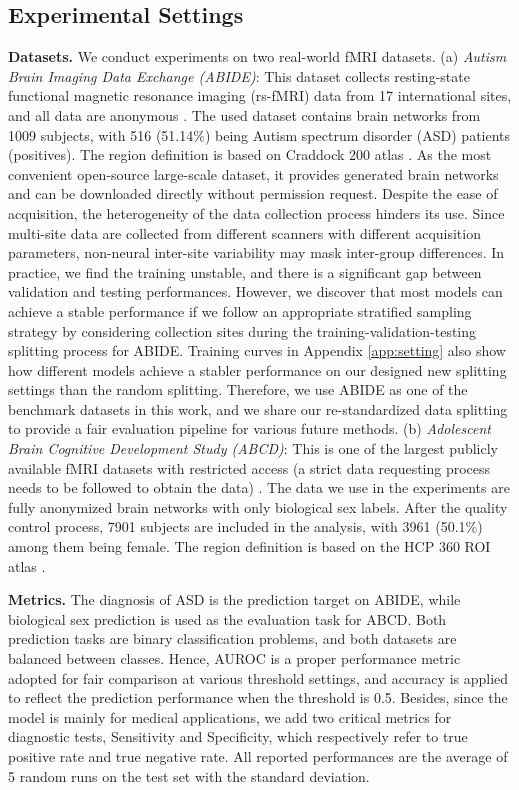 \subsection{Experimental Settings}
\label{sec:expset}
\textbf{Datasets.} We conduct experiments on two real-world fMRI datasets. 
(a) \textit{Autism Brain Imaging Data Exchange (ABIDE)}: This dataset collects resting-state functional magnetic resonance imaging (rs-fMRI) data from 17 international sites, and all data are anonymous \citep{abide}. The used dataset contains brain networks from 1009 subjects, with 516 (51.14\%) being Autism spectrum disorder (ASD) patients (positives). The region definition is based on Craddock 200 atlas \cite{craddock2012whole}. As the most convenient open-source large-scale dataset, it provides generated brain networks and can be downloaded directly without permission request. Despite the ease of acquisition, the heterogeneity of the data collection process hinders its use. Since multi-site data are collected from different scanners with different acquisition parameters, non-neural inter-site variability may mask inter-group differences. In practice, we find the training unstable, and there is a significant gap between validation and testing performances. However, we discover that most models can achieve a stable performance if we follow an appropriate stratified sampling strategy by considering collection sites during the training-validation-testing splitting process for ABIDE. Training curves in Appendix \ref{app:setting} also show how different models achieve a stabler performance on our designed new splitting settings than the random splitting. Therefore, we use ABIDE as one of the benchmark datasets in this work, and we share our re-standardized data splitting to provide a fair evaluation pipeline for various future methods.
(b) \textit{Adolescent Brain Cognitive Development Study (ABCD)}: This is one of the largest publicly available fMRI datasets with restricted access (a strict data requesting process needs to be followed to obtain the data) \citep{ABCD}. The data we use in the experiments are fully anonymized brain networks with only biological sex labels. After the quality control process, 7901 subjects are included in the analysis, with 3961 (50.1\%) among them being female. The region definition is based on the HCP 360 ROI atlas \citep{GLASSER2013105}.

\textbf{Metrics.} The diagnosis of ASD is the prediction target on ABIDE, while biological sex prediction is used as the evaluation task for ABCD. Both prediction tasks are binary classification problems, and both datasets are balanced between classes. Hence, AUROC is a proper performance metric adopted for fair comparison at various threshold settings, and accuracy is applied to reflect the prediction performance when the threshold is 0.5. Besides, since the model is mainly for medical applications, we add two critical metrics for diagnostic tests, Sensitivity and Specificity, which respectively refer to true positive rate and true negative rate. All reported performances are the average of 5 random runs on the test set with the standard deviation.

